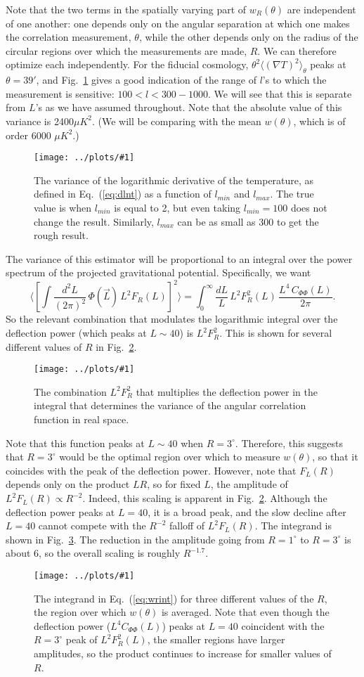 \documentclass[prd,amsmath,amssymb,floatfix,superscriptaddress,nofootinbib]{revtex4-1}
\def\be{\begin{equation}}
\def\ee{\end{equation}}
\newcommand{\ec}[1]{Eq.~(\ref{eq:#1})}
\newcommand{\eql}[1]{\label{eq:#1}}
\newcommand{\rf}[1]{\ref{fig:#1}}
\newcommand{\sfigg}[2]{
\texttt{[image: ../plots/\#1]}
        }
\newcommand{\Spng}[2]{
   \begin{figure}[thbp]
   \begin{center}
    \sfigg{../plots/#1.png}{.7\columnwidth}
    \caption{{\small #2}}
    \label{fig:#1}
     \end{center}
   \end{figure}
}
\begin{document}
Note that the two terms in the spatially varying part of $w_R(\theta)$ are independent of one another: one depends only on the angular separation at which one makes the correlation measurement, $\theta$, while the other depends only on the radius of the circular regions over which the measurements are made, $R$. We can therefore optimize each independently. For the fiducial cosmology, $\theta^2\langle (\nabla T)^2\rangle_\theta$ peaks at $\theta=39'$, and Fig.~\rf{dlntheta} gives a good indication of the range of $l$'s to which the measurement is sensitive: $100<l<300-1000$. We will see that this is separate from $L$'s as we have assumed throughout. Note that the absolute value of this variance is 2400$\mu K^2$. (We will be comparing with the mean $w(\theta)$, which is of order 6000 $\mu K^2$.) 
\Spng{dlntheta}{The variance of the logarithmic derivative of the temperature, as defined in \ec{dlnt} as a function of $l_{min}$ and $l_{max}$. The true value is when $l_{min}$ is equal to 2, but even taking $l_{min}=100$ does not change the result. Similarly, $l_{max}$ can be as small as 300 to get the rough result.}

The variance of this estimator will be proportional to an integral over the power spectrum of the projected gravitational potential. Specifically,
we want
\be
\langle  \left[\int \frac{d^2L}{(2\pi)^2}\, \Phi(\vec L)\, L^2 F_R(L)\right]^2  \rangle
=
\int_0^\infty \frac{dL}{L}\, L^2F_R^2(L) \, \frac{L^4\, C_{\Phi\Phi}(L)}{2\pi}
.\eql{wrint}\ee
So the relevant combination that modulates the logarithmic integral over the deflection power (which peaks at $L\sim 40$) is $L^2F_R^2$. This is shown for several different values of $R$ in Fig.~\rf{mrsq}.
\Spng{mrsq}{The combination $L^2F_R^2$ that multiplies the deflection power in the integral that determines the variance of the angular correlation function in real space.} 
Note that this function peaks at $L\sim40$ when $R=3^\circ$. Therefore, this suggests that $R=3^\circ$ would be the optimal region over which to measure $w(\theta)$, so that it coincides with the peak of the deflection power. However, note that $F_L(R)$ depends only on the product $LR$, so for fixed $L$, the amplitude of $L^2F_L(R)\propto R^{-2}$. Indeed, this scaling is apparent in Fig.~\rf{mrsq}. Although the deflection power peaks at $L=40$, it is a broad peak, and the slow decline after $L=40$ cannot compete with the $R^{-2}$ falloff of $L^2F_L(R)$. The integrand is shown in Fig.~\rf{wrint}. The reduction in the amplitude going from $R=1^\circ$ to $R=3^\circ$ is about 6, so the overall scaling is roughly $R^{-1.7}$.
\Spng{wrint}{The integrand in \ec{wrint} for three different values of the $R$, the region over which $w(\theta)$ is averaged. Note that even though the deflection power ($L^4C_{\Phi\Phi}(L)$) peaks at $L=40$ coincident with the $R=3^\circ$ peak of $L^2F_R^2(L)$, the smaller regions have larger amplitudes, so the product continues to increase for smaller values of $R$.}
\end{document}
